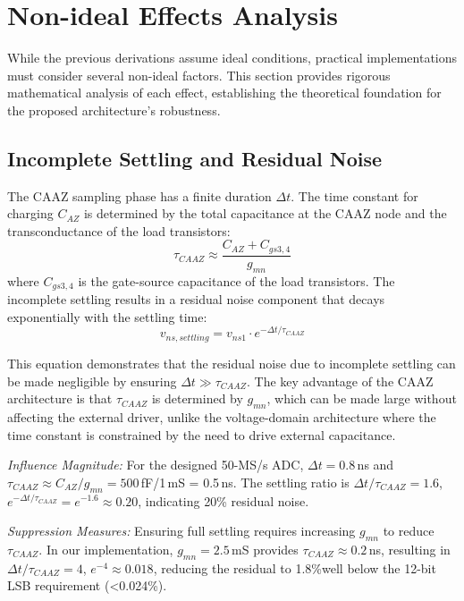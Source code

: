 \documentclass[journal]{IEEEtran}
\begin{document}
\section{Non-ideal Effects Analysis}
While the previous derivations assume ideal conditions, practical implementations must consider several non-ideal factors. This section provides rigorous mathematical analysis of each effect, establishing the theoretical foundation for the proposed architecture's robustness.

\subsection{Incomplete Settling and Residual Noise}
The CAAZ sampling phase has a finite duration $\Delta t$. The time constant for charging $C_{AZ}$ is determined by the total capacitance at the CAAZ node and the transconductance of the load transistors:
\begin{equation}
\tau_{CAAZ} \approx \frac{C_{AZ} + C_{gs3,4}}{g_{mn}}
\label{eq:tau_caz}
\end{equation}
where $C_{gs3,4}$ is the gate-source capacitance of the load transistors. The incomplete settling results in a residual noise component that decays exponentially with the settling time:
\begin{equation}
v_{ns,settling} = v_{ns1} \cdot e^{-\Delta t/\tau_{CAAZ}}
\label{eq:settling_residual}
\end{equation}

This equation demonstrates that the residual noise due to incomplete settling can be made negligible by ensuring $\Delta t \gg \tau_{CAAZ}$. The key advantage of the CAAZ architecture is that $\tau_{CAAZ}$ is determined by $g_{mn}$, which can be made large without affecting the external driver, unlike the voltage-domain architecture where the time constant is constrained by the need to drive external capacitance.

\textit{Influence Magnitude:} For the designed 50-MS/s ADC, $\Delta t = 0.8$\,ns and $\tau_{CAAZ} \approx C_{AZ}/g_{mn} = 500$\,fF/1\,mS = 0.5\,ns. The settling ratio is $\Delta t/\tau_{CAAZ} = 1.6$, $e^{-\Delta t/\tau_{CAAZ}} = e^{-1.6} \approx 0.20$, indicating 20\% residual noise.

\textit{Suppression Measures:} Ensuring full settling requires increasing $g_{mn}$ to reduce $\tau_{CAAZ}$. In our implementation, $g_{mn} = 2.5$\,mS provides $\tau_{CAAZ} \approx 0.2$\,ns, resulting in $\Delta t/\tau_{CAAZ} = 4$, $e^{-4} \approx 0.018$, reducing the residual to 1.8\%\textemdash well below the 12-bit LSB requirement (<0.024\%).
\end{document}
